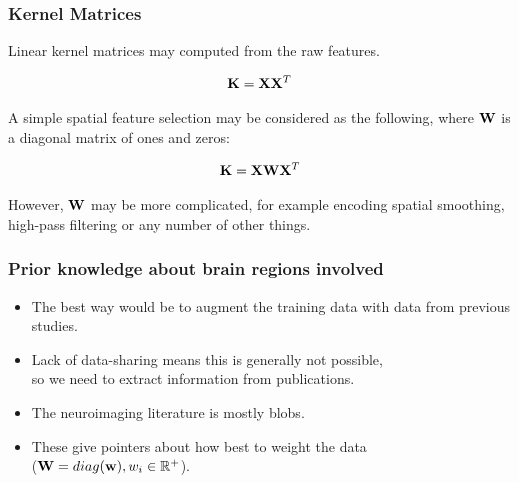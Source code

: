 
\begin{frame}
\frametitle{Kernel Matrices}
Linear kernel matrices may computed from the raw features.
\begin{Large}
\begin{eqnarray*}
{\bf K} = {\bf X}{\bf X}^T
\end{eqnarray*}
\end{Large}
A simple spatial feature selection may be considered as the following, where ${\bf W}$ is a diagonal matrix of ones and zeros:
\begin{Large}
\begin{eqnarray*}
{\bf K} = {\bf X}{\bf W}{\bf X}^T
\end{eqnarray*}
\end{Large}
However, ${\bf W}$ may be more complicated, for example encoding spatial smoothing, high-pass filtering or any number of other things.
\end{frame}

\begin{frame}
\frametitle{Prior knowledge about brain regions involved}
\begin{itemize}
\item The best way would be to augment the training data with data from previous studies.
\item Lack of data-sharing means this is generally not possible,\\
      so we need to extract information from publications.
\item The neuroimaging literature is mostly blobs.
\item These give pointers about how best to weight the data\\
      (${\bf W} = diag({\bf w}), w_i \in \mathbb{R}^+$).
\end{itemize}
\end{frame}

